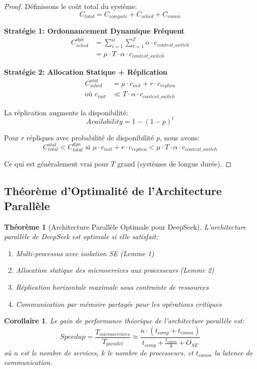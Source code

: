 \documentclass[12pt,a4paper]{article}
\newtheorem{theorem}{Théorème}
\newtheorem{corollary}{Corollaire}
\begin{document}
\begin{proof}
Définissons le coût total du système:
$$C_{total} = C_{compute} + C_{sched} + C_{comm}$$

\textbf{Stratégie 1: Ordonnancement Dynamique Fréquent}
\begin{align*}
C_{sched}^{dyn} &= \sum_{i=1}^{\mu} \sum_{t=1}^{T} \alpha \cdot c_{context\_switch} \\
&= \mu \cdot T \cdot \alpha \cdot c_{context\_switch}
\end{align*}

\textbf{Stratégie 2: Allocation Statique + Réplication}
\begin{align*}
C_{sched}^{stat} &= \mu \cdot c_{init} + r \cdot c_{replica} \\
\text{où } c_{init} &\ll T \cdot \alpha \cdot c_{context\_switch}
\end{align*}

La réplication augmente la disponibilité:
$$Availability = 1 - (1-p)^r$$

Pour $r$ répliques avec probabilité de disponibilité $p$, nous avons:
$$C_{total}^{stat} < C_{total}^{dyn} \text{ si } \mu \cdot c_{init} + r \cdot c_{replica} < \mu \cdot T \cdot \alpha \cdot c_{context\_switch}$$

Ce qui est généralement vrai pour $T$ grand (systèmes de longue durée).
\end{proof}

\subsection{Théorème d'Optimalité de l'Architecture Parallèle}

\begin{theorem}[Architecture Parallèle Optimale pour DeepSeek]
L'architecture parallèle de DeepSeek est optimale si elle satisfait:
\begin{enumerate}
    \item Multi-processus avec isolation SE (Lemme 1)
    \item Allocation statique des microservices aux processeurs (Lemme 2)
    \item Réplication horizontale maximale sous contrainte de ressources
    \item Communication par mémoire partagée pour les opérations critiques
\end{enumerate}
\end{theorem}

\begin{corollary}
Le gain de performance théorique de l'architecture parallèle est:
$$Speedup = \frac{T_{microservices}}{T_{parallel}} \approx \frac{n \cdot (t_{comp} + t_{comm})}{t_{comp} + \frac{t_{comm}}{k} + O_{SE}}$$
où $n$ est le nombre de services, $k$ le nombre de processeurs, et $t_{comm}$ la latence de communication.
\end{corollary}
\end{document}
